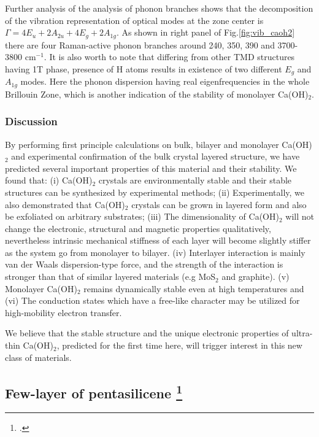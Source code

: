 Further analysis of the analysis of phonon 
branches shows that the decomposition of the vibration representation of optical 
modes at the zone center is $\Gamma = 4E_{u} + 2A_{2u} + 4E_{g} + 2A_{1g}$. As 
shown in right panel of Fig.\ref{fig:vib_caoh2} there are four Raman-active phonon 
branches around 240, 350, 390 and 3700-3800 cm$^{-1}$. It is also worth to note 
that differing from other TMD structures having 1T phase, presence of H atoms 
results in existence of two different $E_{g}$ and $A_{1g}$ modes. Here the 
phonon dispersion having real eigenfrequencies in the whole Brillouin Zone, 
which is another indication of the stability of monolayer Ca(OH)$_2$.


\subsubsection{Discussion}\label{disc}


By performing first principle calculations on bulk, bilayer and 
monolayer Ca(OH)$_2$ and experimental confirmation of the bulk crystal 
layered structure, we have predicted several important properties of this 
material and their stability. We found that: (i) Ca(OH)$_2$ crystals are 
environmentally stable and their stable structures can be synthesized by 
experimental methods; (ii) Experimentally, we also demonstrated that Ca(OH)$_2$ 
crystals can be grown in layered form and also be exfoliated on arbitrary 
substrates; (iii) The dimensionality of Ca(OH)$_2$ will not change the 
electronic, structural and magnetic properties  qualitatively, nevertheless 
intrinsic mechanical stiffness of each layer will become slightly stiffer as 
the system go from monolayer to bilayer. (iv) Interlayer interaction is mainly 
van der Waals dispersion-type force, and
the strength of the interaction is stronger than that of similar layered
materials (e.g MoS$_2$ and graphite). (v) Monolayer 
Ca(OH)$_2$ remains dynamically stable even at high temperatures and (vi) The 
conduction states which have a free-like character may be utilized for 
high-mobility electron transfer. 

We believe that the stable structure and the unique electronic properties of ultra-thin 
Ca(OH)$_2$, predicted for the first time here, will trigger interest in this 
new class of materials. 

\subsection[Few-layer of pentasilicene]{Few-layer of pentasilicene \footcite[This work is published in:][]{Aierken2016.pentasilicene}}

